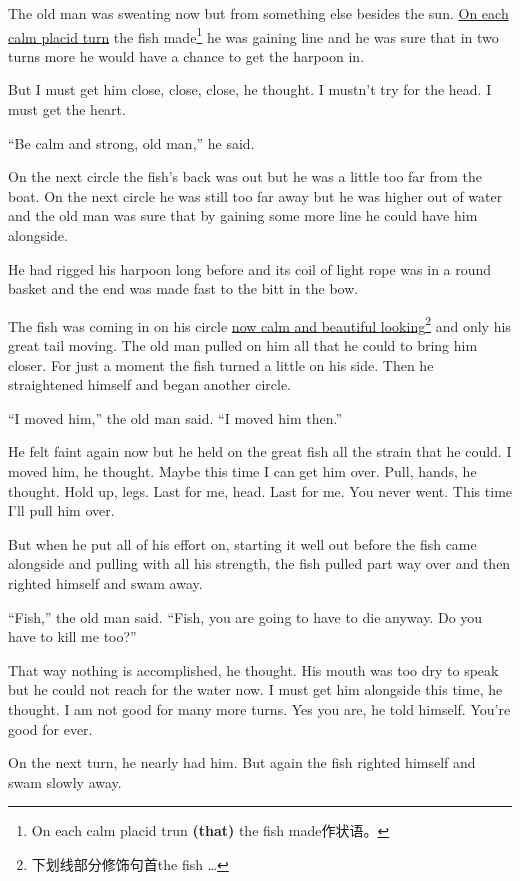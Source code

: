 The old man was sweating now but from something else \gls{besides} the
sun. \uline{On each calm \gls{placid} turn} the fish made\footnote{On each calm
  placid trun \textbf{(that)} the fish made作状语。} he was gaining line and
he was sure that in two turns more he would have a chance to get the harpoon
in.

But I must get him close, close, close, he thought. I mustn't try for the
head. I must get the heart.

``Be calm and strong, old man,'' he said.

On the next circle the fish's back was out but he was a little too far from
the boat. On the next circle he was still too far away but he was higher out
of water and the old man was sure that by \gls{gaining} some more line he could
have him alongside.

He had rigged his harpoon long before and its coil of light rope was in a
round basket and the end was made fast to the bitt in the bow.

The fish was coming in on his circle \uline{now calm and beautiful
  looking}\footnote{下划线部分修饰句首the fish \ldots{}} and only his great tail
moving. The old man pulled on him all that he could to bring him closer. For
just a moment the fish turned a little on his side. Then he
\gls{straightened} himself and began another circle.

``I moved him,'' the old man said. ``I moved him then.''

He felt faint again now but he held on the great fish all the strain that he
could. I moved him, he thought. Maybe this time I can get him over. Pull,
hands, he thought. Hold up, legs. Last for me, head. Last for me. You never
went. This time I'll pull him over.

But when he put all of his effort on, starting it well out before the fish
came alongside and pulling with all his strength, the fish pulled part way
over and then righted himself and swam away.

``Fish,'' the old man said. ``Fish, you are going to have to die anyway. Do
you have to kill me too?''

That way nothing is \gls{accomplished}, he thought. His mouth was too dry to
speak but he could not reach for the water now. I must get him alongside
this time, he thought. I am not good for many more turns. Yes you are, he
told himself. You're good for ever.

On the next turn, he nearly had him. But again the fish righted himself and
swam slowly away.

